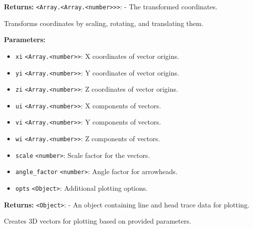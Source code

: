 \documentclass[12pt,a4paper]{article}
\begin{document}
\noindent \textbf{Returns:} \texttt{<Array.<Array.<number>>>}: - The transformed coordinates.

\noindent Transforms coordinates by scaling, rotating, and translating them.

\vspace{5mm}
\noindent {}


\noindent \textbf{Parameters:}
\begin{itemize}
  \item \texttt{xi} \texttt{<Array.<number>>}: X coordinates of vector origins.
  \item \texttt{yi} \texttt{<Array.<number>>}: Y coordinates of vector origins.
  \item \texttt{zi} \texttt{<Array.<number>>}: Z coordinates of vector origins.
  \item \texttt{ui} \texttt{<Array.<number>>}: X components of vectors.
  \item \texttt{vi} \texttt{<Array.<number>>}: Y components of vectors.
  \item \texttt{wi} \texttt{<Array.<number>>}: Z components of vectors.
  \item \texttt{scale} \texttt{<number>}: Scale factor for the vectors.
  \item \texttt{angle\_factor} \texttt{<number>}: Angle factor for arrowheads.
  \item \texttt{opts} \texttt{<Object>}: Additional plotting options.
\end{itemize}

\noindent \textbf{Returns:} \texttt{<Object>}: - An object containing line and head trace data for plotting.

\noindent Creates 3D vectors for plotting based on provided parameters.

\vspace{5mm}
\noindent {}
\end{document}
